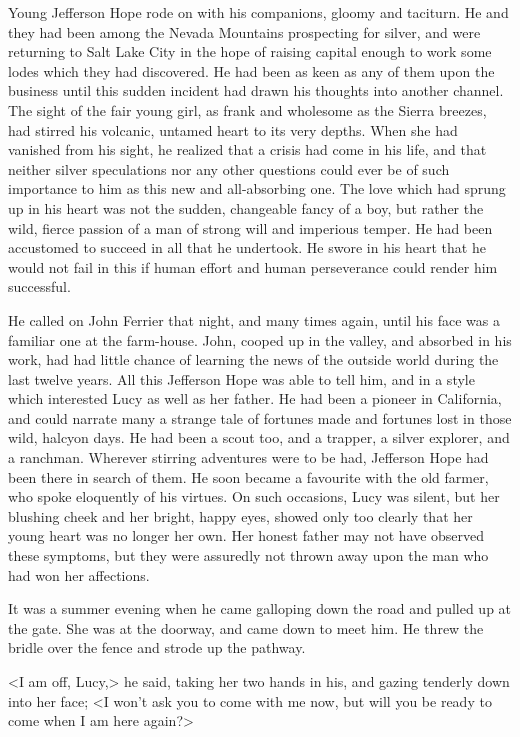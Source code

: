 Young Jefferson Hope rode on with his companions, gloomy and taciturn. He and they had been among the Nevada Mountains prospecting for silver, and were returning to Salt Lake City in the hope of raising capital enough to work some lodes which they had discovered. He had been as keen as any of them upon the business until this sudden incident had drawn his thoughts into another channel. The sight of the fair young girl, as frank and wholesome as the Sierra breezes, had stirred his volcanic, untamed heart to its very depths. When she had vanished from his sight, he realized that a crisis had come in his life, and that neither silver speculations nor any other questions could ever be of such importance to him as this new and all-absorbing one. The love which had sprung up in his heart was not the sudden, changeable fancy of a boy, but rather the wild, fierce passion of a man of strong will and imperious temper. He had been accustomed to succeed in all that he undertook. He swore in his heart that he would not fail in this if human effort and human perseverance could render him successful.

He called on John Ferrier that night, and many times again, until his face was a familiar one at the farm-house. John, cooped up in the valley, and absorbed in his work, had had little chance of learning the news of the outside world during the last twelve years. All this Jefferson Hope was able to tell him, and in a style which interested Lucy as well as her father. He had been a pioneer in California, and could narrate many a strange tale of fortunes made and fortunes lost in those wild, halcyon days. He had been a scout too, and a trapper, a silver explorer, and a ranchman. Wherever stirring adventures were to be had, Jefferson Hope had been there in search of them. He soon became a favourite with the old farmer, who spoke eloquently of his virtues. On such occasions, Lucy was silent, but her blushing cheek and her bright, happy eyes, showed only too clearly that her young heart was no longer her own. Her honest father may not have observed these symptoms, but they were assuredly not thrown away upon the man who had won her affections.

It was a summer evening when he came galloping down the road and pulled up at the gate. She was at the doorway, and came down to meet him. He threw the bridle over the fence and strode up the pathway.

<I am off, Lucy,> he said, taking her two hands in his, and gazing tenderly down into her face; <I won't ask you to come with me now, but will you be ready to come when I am here again?>


